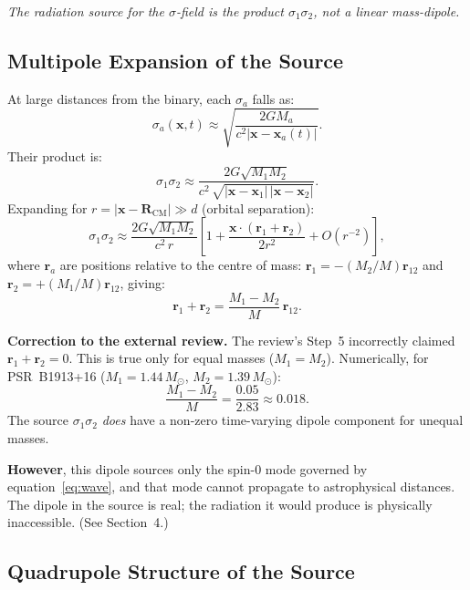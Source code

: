 \documentclass[12pt,a4paper]{article}
\newcommand{\Msun}{M_{\odot}}
\begin{document}
\textit{The radiation source for the $\sigma$-field is the product
$\sigma_1\sigma_2$, not a linear mass-dipole.}

\subsection{Multipole Expansion of the Source}

At large distances from the binary, each $\sigma_a$ falls as:
\begin{equation}
  \sigma_a(\mathbf{x},t) \approx \sqrt{\frac{2GM_a}{c^2|\mathbf{x}-\mathbf{x}_a(t)|}}.
\end{equation}
Their product is:
\begin{equation}
  \sigma_1\sigma_2 \approx \frac{2G\sqrt{M_1 M_2}}{c^2\,\sqrt{|\mathbf{x}-\mathbf{x}_1|\,|\mathbf{x}-\mathbf{x}_2|}}.
\end{equation}
Expanding for $r = |\mathbf{x} - \mathbf{R}_\mathrm{CM}|\gg d$ (orbital separation):
\begin{equation}
  \sigma_1\sigma_2 \approx
  \frac{2G\sqrt{M_1M_2}}{c^2\,r}
  \left[1 + \frac{\mathbf{x}\cdot(\mathbf{r}_1+\mathbf{r}_2)}{2r^2}
    + O(r^{-2})\right],
\end{equation}
where $\mathbf{r}_a$ are positions relative to the centre of mass:
$\mathbf{r}_1 = -(M_2/M)\mathbf{r}_{12}$ and
$\mathbf{r}_2 = +(M_1/M)\mathbf{r}_{12}$, giving:
\begin{equation}
  \mathbf{r}_1 + \mathbf{r}_2 = \frac{M_1-M_2}{M}\,\mathbf{r}_{12}.
  \label{eq:dipsum}
\end{equation}

\medskip
\noindent\textbf{Correction to the external review.}
The review's Step~5 incorrectly claimed $\mathbf{r}_1+\mathbf{r}_2 = 0$.
This is true only for equal masses ($M_1=M_2$). Numerically, for
PSR~B1913+16 ($M_1=1.44\,\Msun$, $M_2=1.39\,\Msun$):
\begin{equation}
  \frac{M_1-M_2}{M} = \frac{0.05}{2.83} \approx 0.018.
\end{equation}
The source $\sigma_1\sigma_2$ \textit{does} have a non-zero time-varying
dipole component for unequal masses.

\textbf{However}, this dipole sources only the spin-0 mode governed by
equation~\eqref{eq:wave}, and that mode cannot propagate to
astrophysical distances. The dipole in the source is real; the radiation
it would produce is physically inaccessible. (See Section~4.)

\subsection{Quadrupole Structure of the Source}
\end{document}
